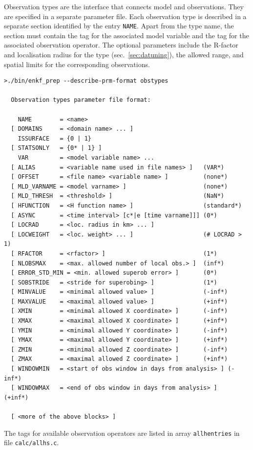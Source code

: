 \documentclass[11pt]{report}
\begin{document}
Observation types are the interface that connects model and observations.
They are specified in a separate parameter file.
Each observation type is described in a separate section identified by the entry \verb|NAME|.
Apart from the type name, the section must contain the tag for the associated model variable and the tag for the associated observation operator.
The optional parameters include the R-factor and localisation radius for the type (sec.~\ref{sec:datuning}), the allowed range, and spatial limits for the corresponding observations.
\begin{Verbatim}[frame=single,fontsize=\footnotesize]
>./bin/enkf_prep --describe-prm-format obstypes

  Observation types parameter file format:

    NAME        = <name>
  [ DOMAINS     = <domain name> ... ]
    ISSURFACE   = {0 | 1}
  [ STATSONLY   = {0* | 1} ]
    VAR         = <model variable name> ...
  [ ALIAS       = <variable name used in file names> ]   (VAR*)
  [ OFFSET      = <file name> <variable name> ]          (none*)
  [ MLD_VARNAME = <model varname> ]                      (none*)
  [ MLD_THRESH  = <threshold> ]                          (NaN*)
  [ HFUNCTION   = <H function name> ]                    (standard*)
  [ ASYNC       = <time interval> [c*|e [time varname]]] (0*)
  [ LOCRAD      = <loc. radius in km> ... ]
  [ LOCWEIGHT   = <loc. weight> ... ]                    (# LOCRAD > 1)
  [ RFACTOR     = <rfactor> ]                            (1*)
  [ NLOBSMAX    = <max. allowed number of local obs.> ]  (inf*)
  [ ERROR_STD_MIN = <min. allowed superob error> ]       (0*)
  [ SOBSTRIDE   = <stride for superobing> ]              (1*)
  [ MINVALUE    = <minimal allowed value> ]              (-inf*)
  [ MAXVALUE    = <maximal allowed value> ]              (+inf*)
  [ XMIN        = <minimal allowed X coordinate> ]       (-inf*)
  [ XMAX        = <maximal allowed X coordinate> ]       (+inf*)
  [ YMIN        = <minimal allowed Y coordinate> ]       (-inf*)
  [ YMAX        = <maximal allowed Y coordinate> ]       (+inf*)
  [ ZMIN        = <minimal allowed Z coordinate> ]       (-inf*)
  [ ZMAX        = <maximal allowed Z coordinate> ]       (+inf*)
  [ WINDOWMIN   = <start of obs window in days from analysis> ] (-inf*)
  [ WINDOWMAX   = <end of obs window in days from analysis> ]   (+inf*)

  [ <more of the above blocks> ]
\end{Verbatim}

The tags for available observation operators are listed in array \verb|allhentries| in file \verb|calc/allhs.c|.
\end{document}
